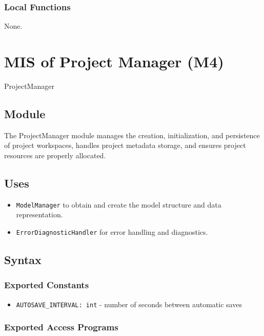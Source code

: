\documentclass[12pt, titlepage]{article}
\begin{document}
\subsubsection{Local Functions}
None.

\section{MIS of Project Manager (M4)}\label{Module4}

ProjectManager

\subsection{Module}

The ProjectManager module manages the creation, initialization, and persistence of project workspaces, handles project metadata storage, and ensures project resources are properly allocated.

\subsection{Uses}
\begin{itemize}
  \item \texttt{ModelManager} to obtain and create the model structure and data representation.
  \item \texttt{ErrorDiagnosticHandler} for error handling and diagnostics.
\end{itemize}

\subsection{Syntax}

\subsubsection{Exported Constants}
\begin{itemize}
  \item \texttt{AUTOSAVE\_INTERVAL: int} - number of seconds between automatic saves 
\end{itemize}

\subsubsection{Exported Access Programs}
\end{document}
